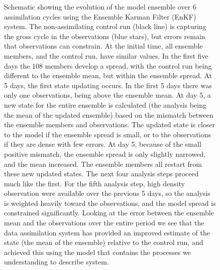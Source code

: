 \begin{figure}[thb]
\begin{center} 
\caption{Schematic showing the evolution of the model ensemble over 6 assimilation cycles using the
Ensemble Karman Filter (EnKF) system. The non-assimilating control run (black line) is capturing the
gross cycle in the observations (blue stars), but errors remain that observations can constrain. At
the initial time, all ensemble members, and the control run, have similar values.  In the first five
days the 108 members develop a spread, with the control run being different to the ensemble mean,
but within the ensemble spread. At 5 days, the first state updating occurs. In the first 5 days
there was only one observations, being above the ensemble mean. At day 5, a new state for the entire
ensemble is calculated (the analysis being the mean of the updated ensemble) based on the mismatch
between the ensemble members and observations. The updated state is closer to the model if the
ensemble spread is small, or to the observations if they are dense with few errors. At day 5,
because of the small positive mismatch, the ensemble spread is only slightly narrowed, and the mean
increased. The ensemble members all restart from these new updated states. The next four analysis
steps proceed much like the first. For the fifth analysis step, high density observation were
available over the previous 5 days, so the analysis is weighted heavily toward the observations, and
the model spread is constrained significantly. Looking at the error between the ensemble mean and
the observations over the entire period we see that the data assimilation system has provided an
improved estimate of the state (the mean of the ensemble) relative to the control run, and achieved
this using the model that contains the processes we understanding to describe system.}
\label{fig:da}
\end{center}
\end{figure}

